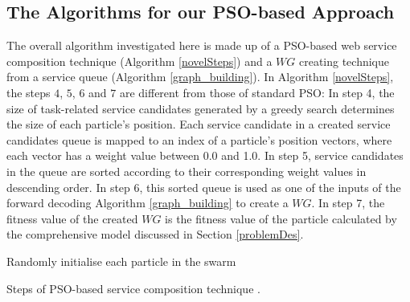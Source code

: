 \documentclass{llncs}
\begin{document}
\subsection{The Algorithms for our PSO-based Approach}\label{PSO-based_algomargin}
The overall algorithm investigated here is made up of a PSO-based web service composition technique (Algorithm \ref{novelSteps}) and a $WG$ creating technique from a service queue (Algorithm \ref{graph_building}). In Algorithm \ref{novelSteps}, the  steps $4$, $5$, $6$ and $7$ are different from those of standard PSO: In step 4, the size of task-related service candidates generated by a greedy search determines the size of each particle's position. Each service candidate in a created service candidates queue is mapped to an index of a particle’s position vectors, where each vector has a weight value between 0.0 and 1.0. In step 5, service candidates in the queue are sorted according to their corresponding weight values in descending order. In step 6, this sorted queue is used as one of the inputs of the forward decoding Algorithm \ref{graph_building} to create a $WG$. In step 7, the fitness value of the created $WG$ is the fitness value of the particle calculated by the comprehensive model discussed in Section \ref{problemDes}.
\vspace{-0.5cm}
\begin{algorithm}
 \SetNlSty{}{}{:}
 Randomly initialise each particle in the swarm\;
\caption{Steps of PSO-based service composition technique \cite{da2016particle}.}
\label{novelSteps}
\end{algorithm} 
\end{document}
